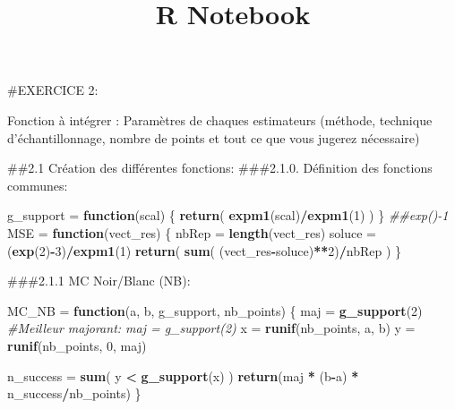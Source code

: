 \documentclass[]{article}
\title{R Notebook}
\author{}
\date{}
\newenvironment{Shaded}{\begin{snugshade}}{\end{snugshade}}
\newcommand{\CommentTok}[1]{\textcolor[rgb]{0.56,0.35,0.01}{\textit{#1}}}
\newcommand{\ControlFlowTok}[1]{\textcolor[rgb]{0.13,0.29,0.53}{\textbf{#1}}}
\newcommand{\DecValTok}[1]{\textcolor[rgb]{0.00,0.00,0.81}{#1}}
\newcommand{\KeywordTok}[1]{\textcolor[rgb]{0.13,0.29,0.53}{\textbf{#1}}}
\newcommand{\NormalTok}[1]{#1}
\newcommand{\OperatorTok}[1]{\textcolor[rgb]{0.81,0.36,0.00}{\textbf{#1}}}
\newcommand{\StringTok}[1]{\textcolor[rgb]{0.31,0.60,0.02}{#1}}
\begin{document}
\maketitle

\#EXERCICE 2:

Fonction à intégrer : Paramètres de chaques estimateurs (méthode,
technique d'échantillonnage, nombre de points et tout ce que vous
jugerez nécessaire)

\#\#2.1 Création des différentes fonctions: \#\#\#2.1.0. Définition des
fonctions communes:

\begin{Shaded}
\begin{Highlighting}[]
\NormalTok{g_support =}\StringTok{ }\ControlFlowTok{function}\NormalTok{(scal) \{ }\KeywordTok{return}\NormalTok{( }\KeywordTok{expm1}\NormalTok{(scal)}\OperatorTok{/}\KeywordTok{expm1}\NormalTok{(}\DecValTok{1}\NormalTok{) ) \} }\CommentTok{##exp()-1}
\NormalTok{MSE =}\StringTok{ }\ControlFlowTok{function}\NormalTok{(vect_res)}
\NormalTok{\{}
\NormalTok{  nbRep =}\StringTok{ }\KeywordTok{length}\NormalTok{(vect_res)}
\NormalTok{  soluce =}\StringTok{ }\NormalTok{(}\KeywordTok{exp}\NormalTok{(}\DecValTok{2}\NormalTok{)}\OperatorTok{-}\DecValTok{3}\NormalTok{)}\OperatorTok{/}\KeywordTok{expm1}\NormalTok{(}\DecValTok{1}\NormalTok{)}
  \KeywordTok{return}\NormalTok{( }\KeywordTok{sum}\NormalTok{( (vect_res}\OperatorTok{-}\NormalTok{soluce)}\OperatorTok{**}\DecValTok{2}\NormalTok{)}\OperatorTok{/}\NormalTok{nbRep )}
\NormalTok{\}}
\end{Highlighting}
\end{Shaded}

\#\#\#2.1.1 MC Noir/Blanc (NB):

\begin{Shaded}
\begin{Highlighting}[]
\NormalTok{MC_NB =}\StringTok{ }\ControlFlowTok{function}\NormalTok{(a, b, g_support, nb_points)}
\NormalTok{\{}
\NormalTok{  maj =}\StringTok{ }\KeywordTok{g_support}\NormalTok{(}\DecValTok{2}\NormalTok{) }\CommentTok{#Meilleur majorant: maj = g_support(2) }
\NormalTok{  x =}\StringTok{ }\KeywordTok{runif}\NormalTok{(nb_points, a, b)}
\NormalTok{  y =}\StringTok{ }\KeywordTok{runif}\NormalTok{(nb_points, }\DecValTok{0}\NormalTok{, maj)}
  
\NormalTok{  n_success =}\StringTok{ }\KeywordTok{sum}\NormalTok{( y }\OperatorTok{<}\StringTok{ }\KeywordTok{g_support}\NormalTok{(x) )}
  \KeywordTok{return}\NormalTok{(maj }\OperatorTok{*}\StringTok{ }\NormalTok{(b}\OperatorTok{-}\NormalTok{a) }\OperatorTok{*}\StringTok{ }\NormalTok{n_success}\OperatorTok{/}\NormalTok{nb_points)  }
\NormalTok{\}}
\end{Highlighting}
\end{Shaded}
\end{document}
